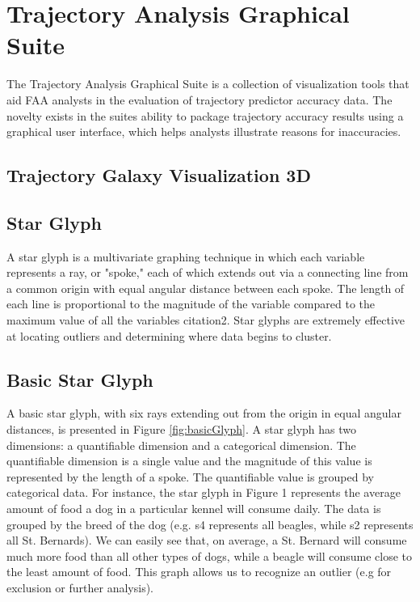 \documentclass[]{article}
\begin{document}
\section{Trajectory Analysis Graphical Suite}
\label{trajAnalysisGraphicalSuite}

The Trajectory Analysis Graphical Suite is a collection of visualization tools that aid FAA analysts in the evaluation of trajectory predictor accuracy data. The novelty exists in the suites ability to package trajectory accuracy results using a graphical user interface, which helps analysts illustrate reasons for inaccuracies.

\subsection{Trajectory Galaxy Visualization 3D}
\label{trajGalaxyVis3d}

\subsection{Star Glyph}
\label{starGlyph}
A star glyph is a multivariate graphing technique in which each variable represents a ray, or "spoke," each of which extends out via a connecting line from a common origin with equal angular distance between each spoke. The length of each line is proportional to the magnitude of the variable compared to the maximum value of all the variables citation2. Star glyphs are extremely effective at locating outliers and determining where data begins to cluster.

\subsection{Basic Star Glyph}
\label{basicStarGlyph}
A basic star glyph, with six rays extending out from the origin in equal angular distances, is presented in Figure \ref{fig:basicGlyph}. A star glyph has two dimensions: a quantifiable dimension and a categorical dimension. The quantifiable dimension is a single value and the magnitude of this value is represented by the length of a spoke. The quantifiable value is grouped by categorical data. For instance, the star glyph in Figure 1 represents the average amount of food a dog in a particular kennel will consume daily. The data is grouped by the breed of the dog (e.g. s4 represents all beagles, while s2 represents all St. Bernards). We can easily see that, on average, a St. Bernard will consume much more food than all other types of dogs, while a beagle will consume close to the least amount of food. This graph allows us to recognize an outlier (e.g for exclusion or further analysis).
\end{document}
